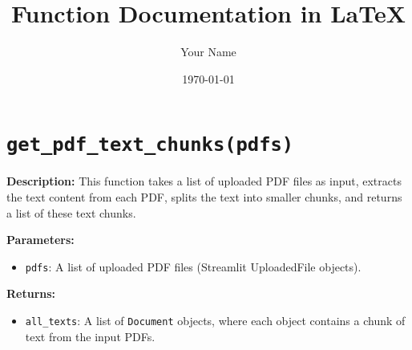 \documentclass{article}
\title{Function Documentation in LaTeX}
\author{Your Name}
\date{\today}
\begin{document}
\maketitle

\section*{\texttt{get\_pdf\_text\_chunks(pdfs)}}

\textbf{Description:} This function takes a list of uploaded PDF files as input, extracts the text content from each PDF, splits the text into smaller chunks, and returns a list of these text chunks.

\textbf{Parameters:}
\begin{itemize}
    \item \texttt{pdfs}: A list of uploaded PDF files (Streamlit UploadedFile objects).
\end{itemize}

\textbf{Returns:}
\begin{itemize}
    \item \texttt{all\_texts}: A list of \texttt{Document} objects, where each object contains a chunk of text from the input PDFs.
\end{itemize}
\end{document}
